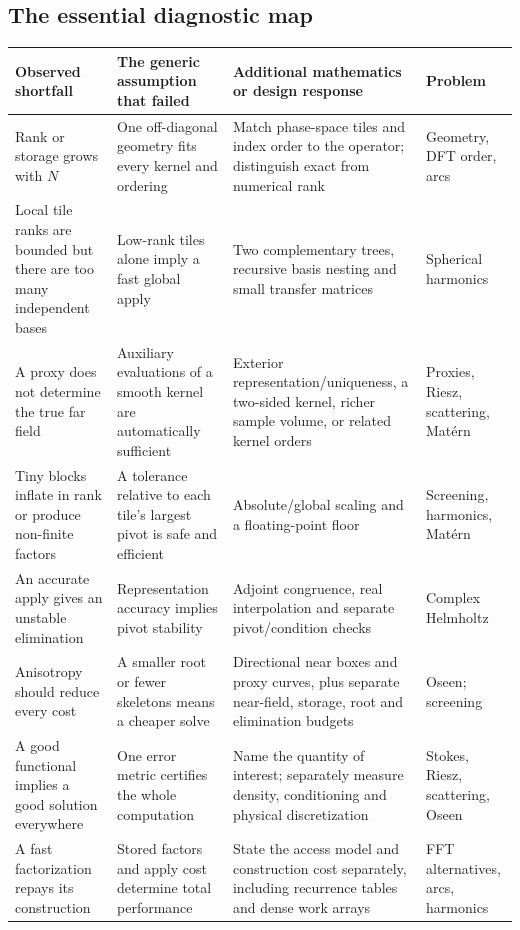 \subsection{The essential diagnostic map}
\begin{longtable}{@{}>{\raggedright\arraybackslash}p{}>{\raggedright\arraybackslash}p{}>{\raggedright\arraybackslash}p{}>{\raggedright\arraybackslash}p{}@{}}
\toprule
Observed shortfall & The generic assumption that failed & Additional mathematics or design response & Problem \\
\midrule
\endhead
Rank or storage grows with $N$ & One off-diagonal geometry fits every kernel and ordering & Match phase-space tiles and index order to the operator; distinguish exact from numerical rank & Geometry, DFT order, arcs \\
Local tile ranks are bounded but there are too many independent bases & Low-rank tiles alone imply a fast global apply & Two complementary trees, recursive basis nesting and small transfer matrices & Spherical harmonics \\
A proxy does not determine the true far field & Auxiliary evaluations of a smooth kernel are automatically sufficient & Exterior representation/uniqueness, a two-sided kernel, richer sample volume, or related kernel orders & Proxies, Riesz, scattering, Matérn \\
Tiny blocks inflate in rank or produce non-finite factors & A tolerance relative to each tile's largest pivot is safe and efficient & Absolute/global scaling and a floating-point floor & Screening, harmonics, Matérn \\
An accurate apply gives an unstable elimination & Representation accuracy implies pivot stability & Adjoint congruence, real interpolation and separate pivot/condition checks & Complex Helmholtz \\
Anisotropy should reduce every cost & A smaller root or fewer skeletons means a cheaper solve & Directional near boxes and proxy curves, plus separate near-field, storage, root and elimination budgets & Oseen; screening \\
A good functional implies a good solution everywhere & One error metric certifies the whole computation & Name the quantity of interest; separately measure density, conditioning and physical discretization & Stokes, Riesz, scattering, Oseen \\
A fast factorization repays its construction & Stored factors and apply cost determine total performance & State the access model and construction cost separately, including recurrence tables and dense work arrays & FFT alternatives, arcs, harmonics \\
\bottomrule
\end{longtable}

